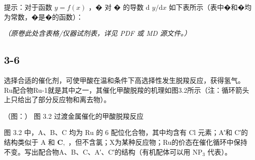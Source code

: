 提⽰：对于函数 $y = f ( x )$ ，� 对 � 的导数 d $y /  { \mathrm { d } } x$ 如下表所⽰（表中�和�均为常数，�是�的函数）：

\textit{（原卷此处含表格/仪器试剂表，详见 PDF 或 MD 源文件。）}

\subsection*{3-6}
选择合适的催化剂，可使甲酸在温和条件下⾼选择性发⽣脱羧反应，获得氢⽓。Ru配合物Ru-1就是其中之⼀，其催化甲酸脱羧的机理如图3.2所⽰（注：循环箭头上只给出了部分反应物和离去物）。

（图：）
图 3.2 过渡⾦属催化的甲酸脱羧反应

图 3.2 中，A、B、C 均为 Ru 的 6 配位化合物，其中均含有 Cl 元素；A′和 C′的结构类似于 A 和 $\mathbf { C } ,$ ，但不含氯；X为某种反应物；Ru的价态在催化循环中保持不变。写出配合物A、B、C、A′、C′的结构（有机配体可以⽤ $\mathrm { N P _ { 3 } }$ 代表）。
